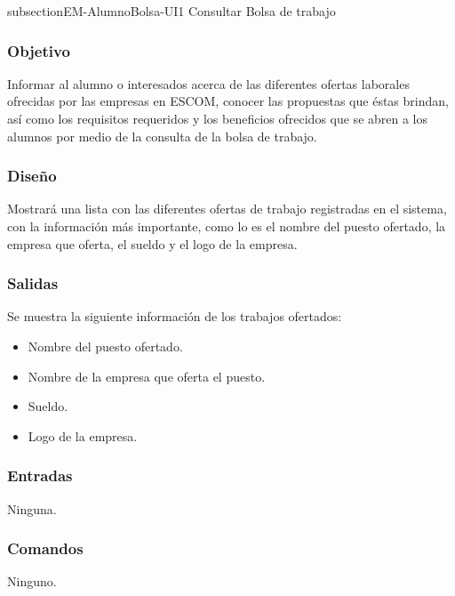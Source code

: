 
\pagebreak subsection{EM-AlumnoBolsa-UI1 Consultar Bolsa de trabajo}

\subsubsection{Objetivo}
	\noindent
	Informar al alumno o interesados acerca de las diferentes ofertas laborales ofrecidas por las empresas en ESCOM, conocer las propuestas que éstas brindan, así como los requisitos requeridos y los beneficios ofrecidos que se abren a los alumnos por medio de la consulta de la bolsa de trabajo. 

\subsubsection{Diseño}
	\noindent
	Mostrará una lista con las diferentes ofertas de trabajo registradas en el sistema, con la información más importante, como lo es el nombre del puesto ofertado, la empresa que oferta, el sueldo y el logo de la empresa. 

\pagebreak
{}

\subsubsection{Salidas}
	\noindent
	Se muestra la siguiente información de los trabajos ofertados:
	\begin{itemize} 
		\item Nombre del puesto ofertado.
		\item Nombre de la empresa que oferta el puesto.
		\item Sueldo.
		\item Logo de la empresa.
	\end{itemize}

\subsubsection{Entradas}
	\noindent
	Ninguna.

\subsubsection{Comandos}
	\noindent
	Ninguno.

